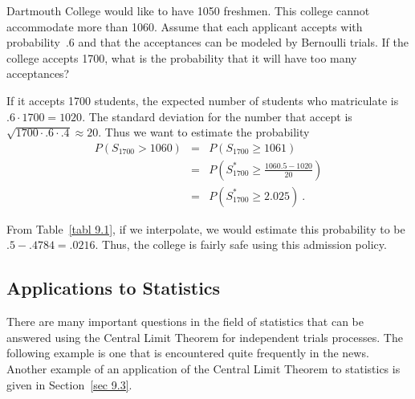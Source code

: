 \begin{example}\label{exam 9.3}
Dartmouth College would like to have 1050 freshmen.  This college cannot
accommodate more than 1060.  Assume that each applicant accepts with
probability~.6 and that the acceptances can be modeled by Bernoulli trials. 
If the college accepts 1700, what is the probability that it will have too
many acceptances?
\par
If it accepts 1700 students, the expected number of students who matriculate is
$.6 \cdot 1700 = 1020$.  The standard deviation for the number that accept is
$\sqrt{1700 \cdot .6 \cdot .4} \approx 20$.  Thus we want to estimate the
probability
\begin{eqnarray*}
P(S_{1700} > 1060) &=& P(S_{1700} \ge 1061) \\
&=& P\left( S_{1700}^* \ge \frac {1060.5 - 1020}{20} \right) \\
                   &=& P(S_{1700}^* \ge 2.025)\ .
\end{eqnarray*}

From Table~\ref{tabl 9.1}, if we interpolate, we would estimate this
probability to be $.5 - .4784 = .0216$.  Thus, the college is fairly safe using
this admission policy.
\end{example}


\subsection*{Applications to Statistics}
There are many important questions in the field of statistics that can be answered using the
Central Limit Theorem for independent trials processes.  The following example is one that is
encountered quite frequently in the news.  Another example of an application of the Central
Limit Theorem to statistics is given in Section~\ref{sec 9.3}.

